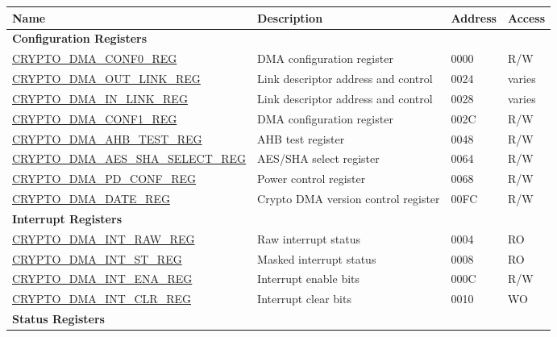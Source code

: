 \begin{longtable}{ | p{6cm} | p{7.2cm} | p{1.3cm} | p{1cm} | }
\hline\rowcolor{lightgray}
Name & Description &  Address & Access \\ \hline
\endhead
\multicolumn{4}{|l|}{\textbf{Configuration Registers}} \\ \hline
\hyperref[regdesc:CRYPTODMACONF0REG]{CRYPTO\_DMA\_CONF0\_REG} & DMA configuration register & \hexprefix{}0000 & R/W \\ \hline
\hyperref[regdesc:CRYPTODMAOUTLINKREG]{CRYPTO\_DMA\_OUT\_LINK\_REG} & Link descriptor address and control & \hexprefix{}0024 & varies \\ \hline
\hyperref[regdesc:CRYPTODMAINLINKREG]{CRYPTO\_DMA\_IN\_LINK\_REG} & Link descriptor address and control & \hexprefix{}0028 & varies \\ \hline
\hyperref[regdesc:CRYPTODMACONF1REG]{CRYPTO\_DMA\_CONF1\_REG} & DMA configuration register & \hexprefix{}002C & R/W \\ \hline
\hyperref[regdesc:CRYPTODMAAHBTESTREG]{CRYPTO\_DMA\_AHB\_TEST\_REG} & AHB test register & \hexprefix{}0048 & R/W \\ \hline
\hyperref[regdesc:CRYPTODMAAESSHASELECTREG]{CRYPTO\_DMA\_AES\_SHA\_SELECT\newline\_REG} & AES/SHA select register & \hexprefix{}0064 & R/W \\ \hline
\hyperref[regdesc:CRYPTODMAPDCONFREG]{CRYPTO\_DMA\_PD\_CONF\_REG} & Power control register & \hexprefix{}0068 & R/W \\ \hline
\hyperref[regdesc:CRYPTODMADATEREG]{CRYPTO\_DMA\_DATE\_REG} & Crypto DMA version control register & \hexprefix{}00FC & R/W \\ \hline
\multicolumn{4}{|l|}{\textbf{Interrupt Registers}} \\ \hline
\hyperref[regdesc:CRYPTODMAINTRAWREG]{CRYPTO\_DMA\_INT\_RAW\_REG} & Raw interrupt status & \hexprefix{}0004 & RO \\ \hline
\hyperref[regdesc:CRYPTODMAINTSTREG]{CRYPTO\_DMA\_INT\_ST\_REG} & Masked interrupt status & \hexprefix{}0008 & RO \\ \hline
\hyperref[regdesc:CRYPTODMAINTENAREG]{CRYPTO\_DMA\_INT\_ENA\_REG} & Interrupt enable bits & \hexprefix{}000C & R/W \\ \hline
\hyperref[regdesc:CRYPTODMAINTCLRREG]{CRYPTO\_DMA\_INT\_CLR\_REG} & Interrupt clear bits & \hexprefix{}0010 & WO \\ \hline
\multicolumn{4}{|l|}{\textbf{Status Registers}} \\ \hline

\end{longtable}
